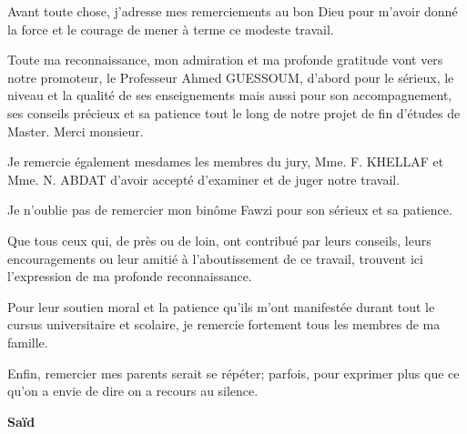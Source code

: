
\vspace{1.5cm}

Avant toute chose, j'adresse mes remerciements au bon Dieu pour m'avoir donné la force et le courage de mener à terme ce modeste travail.

Toute ma reconnaissance, mon admiration et ma profonde gratitude vont vers notre promoteur, le Professeur Ahmed GUESSOUM, d'abord pour le sérieux, le niveau et la qualité de ses enseignements mais aussi pour son accompagnement, ses conseils précieux et sa patience tout le long de notre projet de fin d'études de Master. Merci monsieur.

Je remercie également mesdames les membres du jury, Mme. F. KHELLAF et Mme. N. ABDAT d'avoir accepté d'examiner et de juger notre travail.

Je n'oublie pas de remercier mon binôme Fawzi pour son sérieux et sa patience.

Que tous ceux qui, de près ou de loin, ont contribué par leurs conseils, leurs encouragements ou leur amitié à l'aboutissement de ce travail, trouvent ici l'expression de ma profonde reconnaissance.

Pour leur soutien moral et la patience qu'ils m'ont manifestée durant tout le cursus universitaire et scolaire, je remercie fortement tous les membres de ma famille.

Enfin, remercier mes parents serait se répéter; parfois, pour exprimer plus que ce qu'on a envie de dire on a recours au silence.

\vspace{0.5cm}
\begin{center}
\Large
\hspace{12.5cm}
\textbf{Saïd}
\end{center}